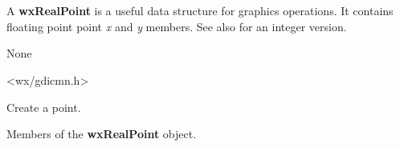 \section{}\label{wxrealpoint}

A {\bf wxRealPoint} is a useful data structure for graphics operations.
It contains floating point point {\it x} and {\it y} members.
See also  for an integer version.


None


<wx/gdicmn.h>







Create a point.



Members of the {\bf wxRealPoint} object.


